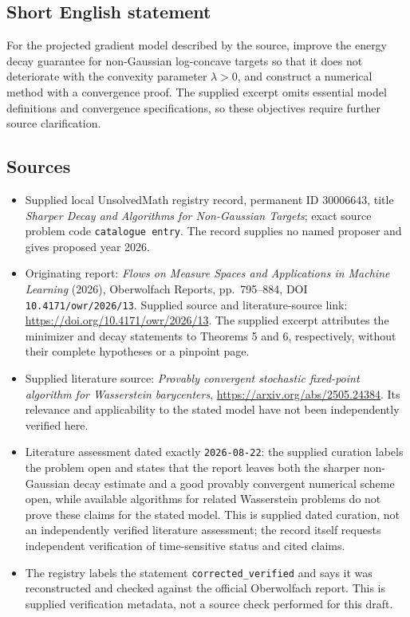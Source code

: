 \documentclass[11pt]{article}
\begin{document}
\subsection{Short English statement}
For the projected gradient model described by the source, improve the energy decay guarantee for non-Gaussian log-concave targets so that it does not deteriorate with the convexity parameter \(\lambda>0\), and construct a numerical method with a convergence proof. The supplied excerpt omits essential model definitions and convergence specifications, so these objectives require further source clarification.
\subsection{Sources}
\begin{itemize}
\item Supplied local UnsolvedMath registry record, permanent ID \(30006643\), title \emph{Sharper Decay and Algorithms for Non-Gaussian Targets}; exact source problem code \texttt{catalogue entry}. The record supplies no named proposer and gives proposed year 2026.
\item Originating report: \emph{Flows on Measure Spaces and Applications in Machine Learning} (2026), Oberwolfach Reports, pp.\ 795--884, DOI \texttt{10.4171/owr/2026/13}. Supplied source and literature-source link: \url{https://doi.org/10.4171/owr/2026/13}. The supplied excerpt attributes the minimizer and decay statements to Theorems 5 and 6, respectively, without their complete hypotheses or a pinpoint page.
\item Supplied literature source: \emph{Provably convergent stochastic fixed-point algorithm for Wasserstein barycenters}, \url{https://arxiv.org/abs/2505.24384}. Its relevance and applicability to the stated model have not been independently verified here.
\item Literature assessment dated exactly \texttt{2026-08-22}: the supplied curation labels the problem open and states that the report leaves both the sharper non-Gaussian decay estimate and a good provably convergent numerical scheme open, while available algorithms for related Wasserstein problems do not prove these claims for the stated model. This is supplied dated curation, not an independently verified literature assessment; the record itself requests independent verification of time-sensitive status and cited claims.
\item The registry labels the statement \texttt{corrected\_verified} and says it was reconstructed and checked against the official Oberwolfach report. This is supplied verification metadata, not a source check performed for this draft.
\end{itemize}
\end{document}
